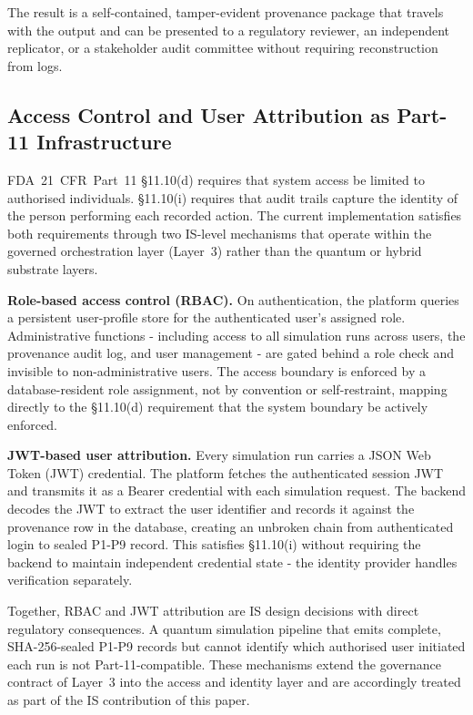 \documentclass[11pt,letterpaper]{article}
\begin{document}
The result is a self-contained, tamper-evident provenance package that travels with
the output and can be presented to a regulatory reviewer, an independent replicator, or a
stakeholder audit committee without requiring reconstruction from logs.

\subsection{Access Control and User Attribution as Part-11 Infrastructure}
\label{sec:rbac-jwt}

FDA~21~CFR~Part~11 \S11.10(d) requires that system access be limited to authorised
individuals.  \S11.10(i) requires that audit trails capture the identity of the person
performing each recorded action.  The current implementation satisfies both requirements
through two IS-level mechanisms that operate within the governed orchestration layer
(Layer~3) rather than the quantum or hybrid substrate layers.

\textbf{Role-based access control (RBAC).}  On authentication, the platform queries a
persistent user-profile store for the authenticated user's assigned role.  Administrative
functions - including access to all simulation runs across users, the provenance audit log,
and user management - are gated behind a role check and invisible to non-administrative
users.  The access boundary is enforced by a database-resident role assignment, not by
convention or self-restraint, mapping directly to the \S11.10(d) requirement that the
system boundary be actively enforced.

\textbf{JWT-based user attribution.}  Every simulation run carries a JSON Web Token (JWT)
credential.  The platform fetches the authenticated session JWT and transmits it as a
Bearer credential with each simulation request.  The backend decodes the JWT to extract
the user identifier and records it against the provenance row in the database, creating an
unbroken chain from authenticated login to sealed P1-P9 record.  This satisfies
\S11.10(i) without requiring the backend to maintain independent credential state - the
identity provider handles verification separately.

Together, RBAC and JWT attribution are IS design decisions with direct regulatory
consequences.  A quantum simulation pipeline that emits complete, SHA-256-sealed P1-P9
records but cannot identify which authorised user initiated each run is not
Part-11-compatible.  These mechanisms extend the governance contract of Layer~3 into the
access and identity layer and are accordingly treated as part of the IS contribution of
this paper.
\end{document}
